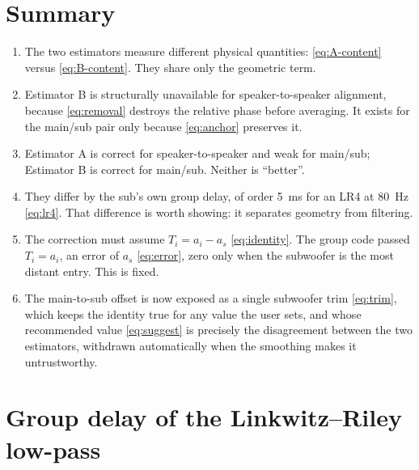 \documentclass[11pt,a4paper]{article}
\begin{document}
\section{Summary}

\begin{enumerate}[leftmargin=*]
\item The two estimators measure different physical quantities:
  \eqref{eq:A-content} versus \eqref{eq:B-content}. They share only the
  geometric term.
\item Estimator B is structurally unavailable for speaker-to-speaker alignment,
  because \eqref{eq:removal} destroys the relative phase before averaging. It
  exists for the main/sub pair only because \eqref{eq:anchor} preserves it.
\item Estimator A is correct for speaker-to-speaker and weak for main/sub;
  Estimator B is correct for main/sub. Neither is ``better''.
\item They differ by the sub's own group delay, of order \SI{5}{\milli\second}
  for an LR4 at \SI{80}{\hertz} \eqref{eq:lr4}. That difference is worth showing:
  it separates geometry from filtering.
\item The correction must assume $T_i = a_i - a_s$ \eqref{eq:identity}. The group
  code passed $T_i = a_i$, an error of $a_s$ \eqref{eq:error}, zero only when the
  subwoofer is the most distant entry. This is fixed.
\item The main-to-sub offset is now exposed as a single subwoofer trim
  \eqref{eq:trim}, which keeps the identity true for any value the user sets, and
  whose recommended value \eqref{eq:suggest} is precisely the disagreement
  between the two estimators, withdrawn automatically when the smoothing makes
  it untrustworthy.
\end{enumerate}

\appendix
\section{Group delay of the Linkwitz--Riley low-pass}
\label{app:lr4}
\end{document}
